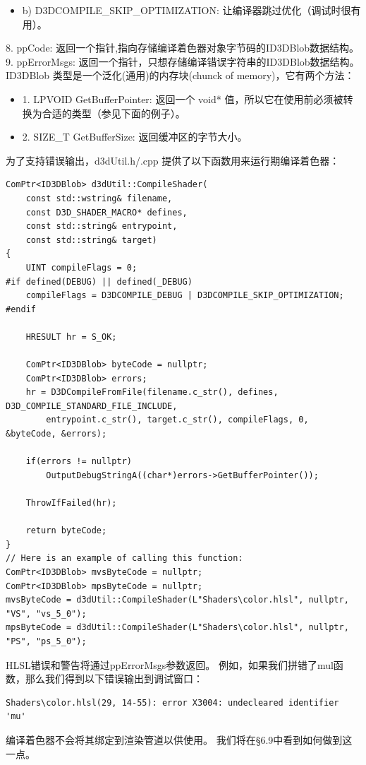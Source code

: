\documentclass[11pt,a4paper,oldfontcommands]{memoir}
\begin{document}
{\begin{flushleft}
\begin{itemize}
  \item b) D3DCOMPILE\_SKIP\_OPTIMIZATION: 让编译器跳过优化（调试时很有用）。
\end{itemize}
8. ppCode: 返回一个指针,指向存储编译着色器对象字节码的ID3DBlob数据结构。\\
9. ppErrorMsgs: 返回一个指针，只想存储编译错误字符串的ID3DBlob数据结构。\\
ID3DBlob 类型是一个泛化(通用)的内存块(chunck of memory)，它有两个方法：\\
\begin{itemize}
    \item 1. LPVOID GetBufferPointer: 返回一个 void* 值，所以它在使用前必须被转换为合适的类型（参见下面的例子）。
    \item 2. SIZE\_T GetBufferSize: 返回缓冲区的字节大小。
\end{itemize}
为了支持错误输出，d3dUtil.h/.cpp 提供了以下函数用来运行期编译着色器：\\
\begin{lstlisting}
ComPtr<ID3DBlob> d3dUtil::CompileShader(
    const std::wstring& filename,
    const D3D_SHADER_MACRO* defines,
    const std::string& entrypoint,
    const std::string& target)
{
    UINT compileFlags = 0;
#if defined(DEBUG) || defined(_DEBUG)  
    compileFlags = D3DCOMPILE_DEBUG | D3DCOMPILE_SKIP_OPTIMIZATION;
#endif

    HRESULT hr = S_OK;

    ComPtr<ID3DBlob> byteCode = nullptr;
    ComPtr<ID3DBlob> errors;
    hr = D3DCompileFromFile(filename.c_str(), defines, D3D_COMPILE_STANDARD_FILE_INCLUDE,
        entrypoint.c_str(), target.c_str(), compileFlags, 0, &byteCode, &errors);

    if(errors != nullptr)
        OutputDebugStringA((char*)errors->GetBufferPointer());

    ThrowIfFailed(hr);

    return byteCode;
}
// Here is an example of calling this function:
ComPtr<ID3DBlob> mvsByteCode = nullptr;
ComPtr<ID3DBlob> mpsByteCode = nullptr;
mvsByteCode = d3dUtil::CompileShader(L"Shaders\color.hlsl", nullptr, "VS", "vs_5_0");
mpsByteCode = d3dUtil::CompileShader(L"Shaders\color.hlsl", nullptr, "PS", "ps_5_0");
\end{lstlisting}
HLSL错误和警告将通过ppErrorMsgs参数返回。 例如，如果我们拼错了mul函数，那么我们得到以下错误输出到调试窗口：\\
\begin{lstlisting}
Shaders\color.hlsl(29, 14-55): error X3004: undecleared identifier 'mu'
\end{lstlisting}
编译着色器不会将其绑定到渲染管道以供使用。 我们将在§6.9中看到如何做到这一点。
\end{flushleft}

}
\end{document}
